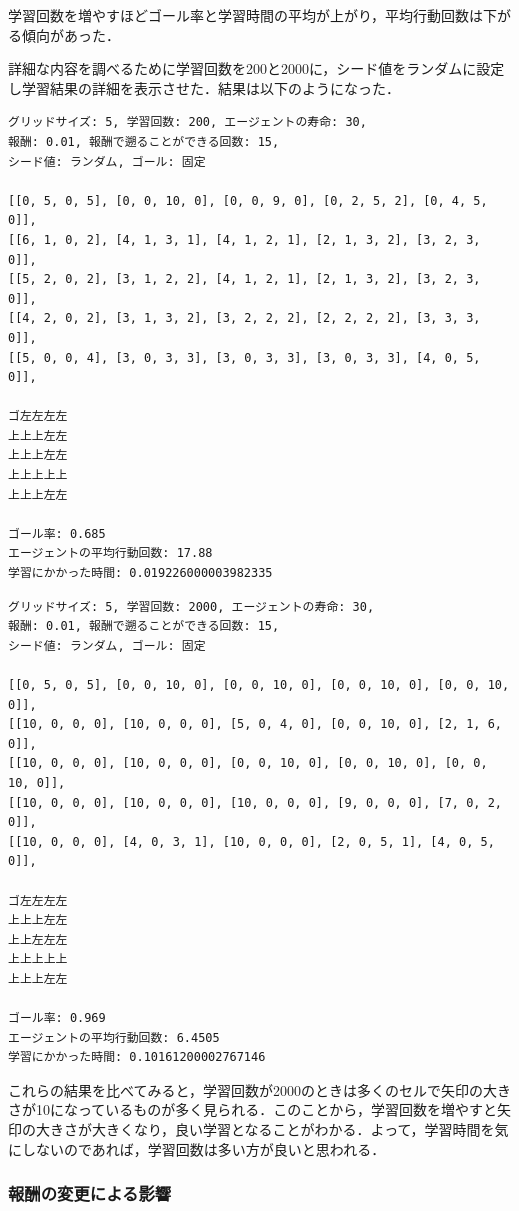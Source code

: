 \documentclass[a4j,11pt]{jarticle}
\begin{document}
学習回数を増やすほどゴール率と学習時間の平均が上がり，平均行動回数は下がる傾向があった．

詳細な内容を調べるために学習回数を200と2000に，シード値をランダムに設定し学習結果の詳細を表示させた．結果は以下のようになった．

\begin{verbatim}
グリッドサイズ: 5, 学習回数: 200, エージェントの寿命: 30,
報酬: 0.01, 報酬で遡ることができる回数: 15,
シード値: ランダム, ゴール: 固定

[[0, 5, 0, 5], [0, 0, 10, 0], [0, 0, 9, 0], [0, 2, 5, 2], [0, 4, 5, 0]],
[[6, 1, 0, 2], [4, 1, 3, 1], [4, 1, 2, 1], [2, 1, 3, 2], [3, 2, 3, 0]],
[[5, 2, 0, 2], [3, 1, 2, 2], [4, 1, 2, 1], [2, 1, 3, 2], [3, 2, 3, 0]],
[[4, 2, 0, 2], [3, 1, 3, 2], [3, 2, 2, 2], [2, 2, 2, 2], [3, 3, 3, 0]],
[[5, 0, 0, 4], [3, 0, 3, 3], [3, 0, 3, 3], [3, 0, 3, 3], [4, 0, 5, 0]],

ゴ左左左左
上上上左左
上上上左左
上上上上上
上上上左左

ゴール率: 0.685
エージェントの平均行動回数: 17.88
学習にかかった時間: 0.019226000003982335
\end{verbatim}

\newpage

\begin{verbatim}
グリッドサイズ: 5, 学習回数: 2000, エージェントの寿命: 30,
報酬: 0.01, 報酬で遡ることができる回数: 15,
シード値: ランダム, ゴール: 固定

[[0, 5, 0, 5], [0, 0, 10, 0], [0, 0, 10, 0], [0, 0, 10, 0], [0, 0, 10, 0]],
[[10, 0, 0, 0], [10, 0, 0, 0], [5, 0, 4, 0], [0, 0, 10, 0], [2, 1, 6, 0]],
[[10, 0, 0, 0], [10, 0, 0, 0], [0, 0, 10, 0], [0, 0, 10, 0], [0, 0, 10, 0]],
[[10, 0, 0, 0], [10, 0, 0, 0], [10, 0, 0, 0], [9, 0, 0, 0], [7, 0, 2, 0]],
[[10, 0, 0, 0], [4, 0, 3, 1], [10, 0, 0, 0], [2, 0, 5, 1], [4, 0, 5, 0]],

ゴ左左左左
上上上左左
上上左左左
上上上上上
上上上左左

ゴール率: 0.969
エージェントの平均行動回数: 6.4505
学習にかかった時間: 0.10161200002767146
\end{verbatim}

これらの結果を比べてみると，学習回数が2000のときは多くのセルで矢印の大きさが10になっているものが多く見られる．このことから，学習回数を増やすと矢印の大きさが大きくなり，良い学習となることがわかる．よって，学習時間を気にしないのであれば，学習回数は多い方が良いと思われる．

\newpage

\subsubsection{報酬の変更による影響} %
\end{document}
